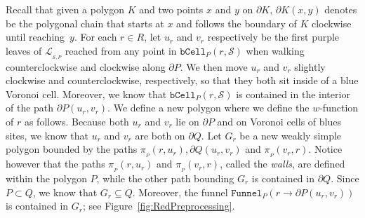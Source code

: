 \documentclass[a4paper,UKenglish]{socg-lipics-v2018}
\newcommand{\s}{\mathcal S}
\newcommand{\p}[3][P]{\ensuremath{\pi_{_{#1}}(#2, #3)}}
\newcommand{\funnel}[2][P]{\ensuremath{\mathtt{Funnel}_{\scriptscriptstyle #1}(#2)}}
\newcommand{\bcell}[2][P]{\ensuremath{\mathtt{bCell}_{\scriptscriptstyle #1}(#2)}}
\newcommand{\LL}[1][\s, P]{\ensuremath{\mathcal L_{_{#1}}}}
\begin{document}

Recall that given a polygon $K$ and two points $x$ and $y$ on $\partial K$, $\partial K(x,y)$ denotes be the polygonal chain that starts at $x$ and follows the boundary of $K$ clockwise until reaching~$y$.
For each $r\in R$, let $u_r$ and $v_r$ respectively be the first purple leaves of $\LL$ reached from any point in $\bcell{r, \s}$ when walking counterclockwise and clockwise along $\partial P$. 
We then move $u_r$ and $v_r$ slightly clockwise and counterclockwise, respectively, so that they both sit inside of a blue Voronoi cell. 
Moreover, we know that $\bcell{r,\s}$ is contained in the interior of the path $\partial P(u_r,v_r)$. 
We define a new polygon where we define the $w$-function of $r$ as follows.
Because both $u_r$ and $v_r$ lie on $\partial P$ and on Voronoi cells of blues sites, we know that $u_r$ and $v_r$ are both on $\partial Q$. 
Let $G_r$ be a new weakly simple polygon bounded by the paths $\p{r}{u_r}, \partial Q(u_r, v_r)$ and $\p{v_r}{r}$. 
Notice however that the paths $\p{r}{u_r}$ and $\p{v_r}{r}$, called the \emph{walls}, are defined within the polygon $P$, while the other path bounding $G_r$ is contained in $\partial Q$. 
Since $P\subset Q$, we know that $G_r\subseteq Q$. 
Moreover, the funnel $\funnel{r\to \partial P(u_r, v_r)}$ is contained in $G_r$; see Figure~\ref{fig:RedPreprocessing}.
\end{document}
